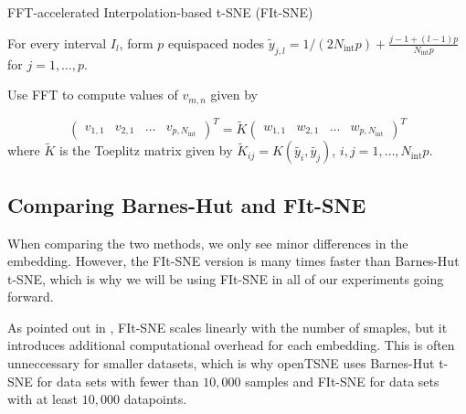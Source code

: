 \begin{algorithm}[H]
    \caption{FFT-accelerated Interpolation-based t-SNE (FIt-SNE)}
    \label{alg:fit-sne}


    For every interval $I_l$, form $p$ equispaced nodes $\tilde{y}_{j, l} = 1/(2N_{\text{int}}p) + \frac{j-1 + (l-1)p}{N_{\text{int}}p}$ for $j=1,\dots,p$. 


    Use FFT to compute values of $v_{m,n}$ given by 

        \[
            \begin{pmatrix}
                v_{1,1} & v_{2,1} & \dots & v_{p, N_{\text{int}}}
            \end{pmatrix}^T = \tilde{K} \begin{pmatrix}
                w_{1,1} & w_{2,1} & \dots & w_{p, N_{\text{int}}}
            \end{pmatrix}^T
        \]
    where $\tilde{K}$ is the Toeplitz matrix given by $\tilde{K}_{ij} = K(\tilde{y_i}, \tilde{y_j})$, $i, j = 1, \dots, N_{\text{int}}p$.
    

\end{algorithm}

\subsection*{Comparing Barnes-Hut and FIt-SNE}
When comparing the two methods, we only see minor differences in the embedding. 
However, the FIt-SNE version is many times faster than Barnes-Hut t-SNE, which is why we will be using FIt-SNE in all of our experiments going forward. 

As pointed out in \cite{openTSNE}, FIt-SNE scales linearly with the number of smaples, but it introduces additional computational overhead for each embedding.
This is often unneccessary for smaller datasets, which is why openTSNE uses Barnes-Hut t-SNE for data sets with fewer than $10,000$ samples and FIt-SNE for data sets with at least $10,000$ datapoints. 

